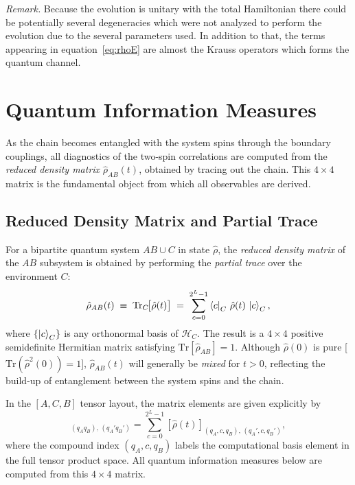 \documentclass[12pt,a4paper]{article}
\newcommand{\rhohat}{\hat{\rho}}
\newcommand{\Hilb}{\mathcal{H}}
\renewcommand{\Tr}{\mathrm{Tr}}
\begin{document}
\textit{Remark.}  Because the evolution is unitary with the total Hamiltonian there could be potentially several degeneracies which were not analyzed to perform the evolution due to the several parameters used. In addition to that, the terms appearing in equation~\ref{eq:rhoE} are almost the Krauss operators which forms the quantum channel.


\section{Quantum Information Measures}
\label{sec:measures}

As the chain becomes entangled with the system spins through the boundary
couplings, all diagnostics of the two-spin correlations are computed from the
\emph{reduced density matrix} $\rhohat_{AB}(t)$, obtained by tracing out the
chain.  This $4\times 4$ matrix is the fundamental object from which all
observables are derived.

\subsection{Reduced Density Matrix and Partial Trace}
\label{subsec:rdm}

For a bipartite quantum system $AB\cup C$ in state $\rhohat$, the
\emph{reduced density matrix} of the $AB$ subsystem is obtained by performing
the \emph{partial trace} over the environment $C$:
\begin{equation}
  \rhohat_{AB}(t) \;\equiv\; \Tr_C\!\bigl[\rhohat(t)\bigr]
  \;=\; \sum_{c=0}^{2^L-1}\bra{c}_C\,\rhohat(t)\,\ket{c}_C,
  \label{eq:rdm}
\end{equation}
where $\{\ket{c}_C\}$ is any orthonormal basis of $\Hilb_C$.  The
result is a $4\times4$ positive semidefinite Hermitian matrix satisfying
$\Tr[\rhohat_{AB}]=1$.  Although $\rhohat(0)$ is pure
[$\Tr(\rhohat^2(0))=1$], $\rhohat_{AB}(t)$ will generally be \emph{mixed}
for $t>0$, reflecting the build-up of entanglement between the system spins
and the chain.

In the $[A,C,B]$ tensor layout, the matrix elements are given explicitly by
\begin{equation}
  [\rhohat_{AB}(t)]_{(q_Aq_B),\,(q_A'q_B')}
  = \sum_{c=0}^{2^L-1}[\rhohat(t)]_{(q_A,c,q_B),\,(q_A',c,q_B')},
  \label{eq:ptrace_elements}
\end{equation}
where the compound index $(q_A, c, q_B)$ labels the computational basis element
in the full tensor product space.  All quantum information measures below are
computed from this $4\times4$ matrix.
\end{document}
